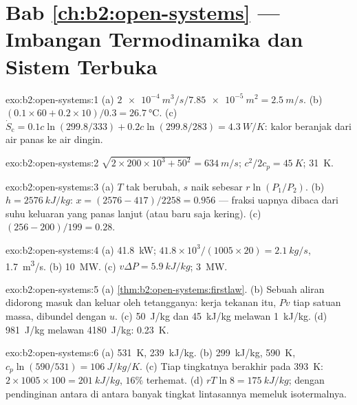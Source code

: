 \section*{Bab \ref{ch:b2:open-systems} --- Imbangan Termodinamika dan Sistem Terbuka}

\begin{solution}{exo:b2:open-systems:1}
(a) $\qty{2e-4}{m^3/s}/\qty{7.85e-5}{m^2} = \qty{2.5}{m/s}$. (b) $(0.1 \times 60 + 0.2
\times 10)/0.3 = \qty{26.7}{\celsius}$. (c) $\dot S_{\text{c}} = 0.1c\ln(299.8/333) +
0.2c\ln(299.8/283) = \qty{4.3}{W/K}$: kalor beranjak dari air panas ke air dingin.
\end{solution}

\begin{solution}{exo:b2:open-systems:2}
$\sqrt{2 \times 200 \times 10^3 + 50^2} = \qty{634}{m/s}$; $c^2/2c_p = \qty{45}{K}$;
\qty{31}{K}.
\end{solution}

\begin{solution}{exo:b2:open-systems:3}
(a) $T$ tak berubah, $s$ naik sebesar $r\ln(P_1/P_2)$. (b) $h = \qty{2576}{kJ/kg}$:
$x = (2576 - 417)/2258 = 0.956$ --- fraksi uapnya dibaca dari
suhu keluaran yang panas lanjut (atau baru saja kering). (c) $(256 -
200)/199 = 0.28$.
\end{solution}

\begin{solution}{exo:b2:open-systems:4}
(a) \qty{41.8}{kW}; $41.8 \times 10^3/(1005 \times 20) = \qty{2.1}{kg/s}$, \qty{1.7}{m^3/s}.
(b) \qty{10}{MW}. (c) $v\Delta P = \qty{5.9}{kJ/kg}$; \qty{3}{MW}.
\end{solution}

\begin{solution}{exo:b2:open-systems:5}
(a) \cref{thm:b2:open-systems:firstlaw}. (b) Sebuah aliran didorong masuk dan
keluar oleh tetangganya: kerja tekanan itu, $Pv$ tiap satuan massa,
dibundel dengan $u$. (c) \qty{50}{J/kg} dan \qty{45}{kJ/kg} melawan \qty{1}{kJ/kg}.
(d) \qty{981}{J/kg} melawan \qty{4180}{J/kg}: \qty{0.23}{K}.
\end{solution}

\begin{solution}{exo:b2:open-systems:6}
(a) \qty{531}{K}, \qty{239}{kJ/kg}. (b) \qty{299}{kJ/kg}, \qty{590}{K}, $c_p\ln(590/531)
= \qty{106}{J/kg/K}$. (c) Tiap tingkatnya berakhir pada \qty{393}{K}: $2 \times 1005 \times 100 =
\qty{201}{kJ/kg}$, $16\%$ terhemat. (d) $rT\ln 8 = \qty{175}{kJ/kg}$; dengan
pendinginan antara di antara banyak tingkat lintasannya memeluk isotermalnya.
\end{solution}

